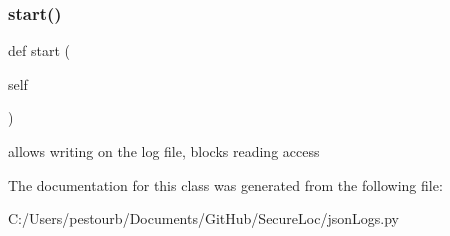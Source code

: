 \subsubsection{\texorpdfstring{start()}{start()}}
{\footnotesize\ttfamily def start (\begin{DoxyParamCaption}\item[{}]{self }\end{DoxyParamCaption})}

\begin{DoxyVerb}allows writing on the log file, blocks reading access\end{DoxyVerb}
 

The documentation for this class was generated from the following file\+:\begin{DoxyCompactItemize}
\item 
C\+:/\+Users/pestourb/\+Documents/\+Git\+Hub/\+Secure\+Loc/json\+Logs.\+py\end{DoxyCompactItemize}
